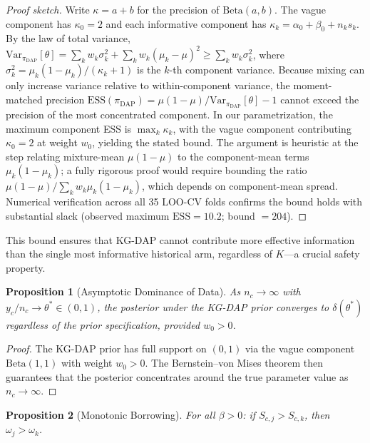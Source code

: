 \documentclass[12pt]{article}
\newtheorem{proposition}{Proposition}
\newcommand{\piDAP}{\pi_{\mathrm{DAP}}}
\newcommand{\ESS}{\mathrm{ESS}}
\begin{document}
\begin{proof}[Proof sketch]
Write $\kappa = a + b$ for the precision of $\mathrm{Beta}(a,b)$. The vague component has $\kappa_0 = 2$ and each informative component has $\kappa_k = \alpha_0 + \beta_0 + n_k s_k$. By the law of total variance, $\mathrm{Var}_{\piDAP}[\theta] = \sum_k w_k \sigma_k^2 + \sum_k w_k(\mu_k - \mu)^2 \geq \sum_k w_k \sigma_k^2$, where $\sigma_k^2 = \mu_k(1-\mu_k)/(\kappa_k + 1)$ is the $k$-th component variance. Because mixing can only increase variance relative to within-component variance, the moment-matched precision $\ESS(\piDAP) = \mu(1-\mu)/\mathrm{Var}_{\piDAP}[\theta] - 1$ cannot exceed the precision of the most concentrated component. In our parametrization, the maximum component ESS is $\max_k \kappa_k$, with the vague component contributing $\kappa_0 = 2$ at weight $w_0$, yielding the stated bound. The argument is heuristic at the step relating mixture-mean $\mu(1-\mu)$ to the component-mean terms $\mu_k(1-\mu_k)$; a fully rigorous proof would require bounding the ratio $\mu(1-\mu)/\sum_k w_k \mu_k(1-\mu_k)$, which depends on component-mean spread. Numerical verification across all 35 LOO-CV folds confirms the bound holds with substantial slack (observed maximum $\ESS = 10.2$; bound $= 204$).
\end{proof}

This bound ensures that KG-DAP cannot contribute more effective information than the single most informative historical arm, regardless of $K$---a crucial safety property.

\begin{proposition}[Asymptotic Dominance of Data]
\label{prop:asymptotic}
As $n_c \to \infty$ with $y_c / n_c \to \theta^* \in (0,1)$, the posterior under the KG-DAP prior converges to $\delta(\theta^*)$ regardless of the prior specification, provided $w_0 > 0$.
\end{proposition}

\begin{proof}
The KG-DAP prior has full support on $(0,1)$ via the vague component $\mathrm{Beta}(1,1)$ with weight $w_0 > 0$. The Bernstein--von Mises theorem then guarantees that the posterior concentrates around the true parameter value as $n_c \to \infty$.
\end{proof}

\begin{proposition}[Monotonic Borrowing]
\label{prop:monotone}
For all $\beta > 0$: if $S_{c,j} > S_{c,k}$, then $\omega_j > \omega_k$.
\end{proposition}
\end{document}
